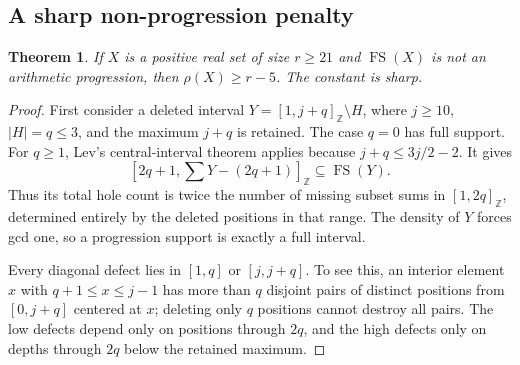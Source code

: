 \documentclass[11pt,a4paper]{article}
\newtheorem{theorem}{Theorem}[section]
\theoremstyle{remark}
\newcommand{\FS}{\operatorname{FS}}
\newcommand{\Z}{\mathbb Z}
\begin{document}
\subsection{A sharp non-progression penalty}
\begin{theorem}\label{u86:thm:nonAPsharp}
If $X$ is a positive real set of size $r\ge21$ and $\FS(X)$ is not an
arithmetic progression, then $\rho(X)\ge r-5$. The constant is sharp.
\end{theorem}
\begin{proof}
First consider a deleted interval
$Y=[1,j+q]_{\Z}\setminus H$, where $j\ge10$, $|H|=q\le3$, and
the maximum $j+q$ is retained. The case $q=0$ has full support. For
$q\ge1$, Lev's central-interval theorem applies because
$j+q\le3j/2-2$. It gives
\[
 [2q+1,\sum Y-(2q+1)]_{\Z}\subseteq\FS(Y).
\]
Thus its total hole count is twice the number of missing subset sums in
$[1,2q]_{\Z}$, determined entirely by the deleted positions in that range.
The density of $Y$ forces gcd one, so a progression support is exactly a
full interval.

Every diagonal defect lies in $[1,q]$ or $[j,j+q]$. To see this, an
interior element $x$ with $q+1\le x\le j-1$ has more than $q$
disjoint pairs of distinct positions from $[0,j+q]$ centered at $x$;
deleting only $q$ positions cannot destroy all pairs. The low defects
depend only on positions through $2q$, and the high defects only on
depths through $2q$ below the retained maximum.


\end{proof}
\end{document}
